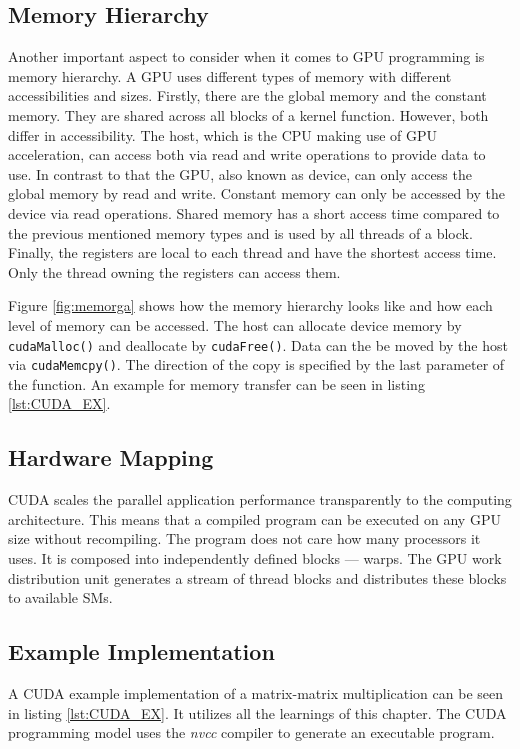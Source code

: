     
\subsection{Memory Hierarchy}
\label{subsec:MemHi}
  Another important aspect to consider when it comes to GPU programming is memory hierarchy.
  A GPU uses different types of memory with different accessibilities and sizes.
  Firstly, there are the global memory and the constant memory.
  They are shared across all blocks of a kernel function.
  However, both differ in accessibility.
  The host, which is the CPU making use of GPU acceleration, can access both via read and write operations to provide data to use.
  In contrast to that the GPU, also known as device, can only access the global memory by read and write.
  Constant memory can only be accessed by the device via read operations.
  Shared memory has a short access time compared to the previous mentioned memory types and is used by all threads of a block.
  Finally, the registers are local to each thread and have the shortest access time.
  Only the thread owning the registers can access them.~\cite{Rauber.2012}~\cite{Huang.2008}
     
  Figure \ref{fig:memorga} shows how the memory hierarchy looks like and how each level of memory can be accessed.
  The host can allocate device memory by \texttt{cudaMalloc()} and deallocate by \texttt{cudaFree()}.
  Data can the be moved by the host via \texttt{cudaMemcpy()}.
  The direction of the copy is specified by the last parameter of the function.
  An example for memory transfer can be seen in listing \ref{lst:CUDA_EX}.
  
  
      
\subsection{Hardware Mapping}
  CUDA scales the parallel application performance transparently to the computing architecture.
  This means that a compiled program can be executed on any GPU size without recompiling.
  The program does not care how many processors it uses.
  It is composed into independently defined blocks --- warps.
  The GPU work distribution unit generates a stream of thread blocks and distributes these blocks to available SMs.~\cite{Lindholm.2008}~\cite{NVIDIA.2019}
  
\subsection{Example Implementation}
  A CUDA example implementation of a matrix-matrix multiplication can be seen in listing \ref{lst:CUDA_EX}.
  It utilizes all the learnings of this chapter.
  The CUDA programming model uses the \textit{nvcc} compiler to generate an executable program.

